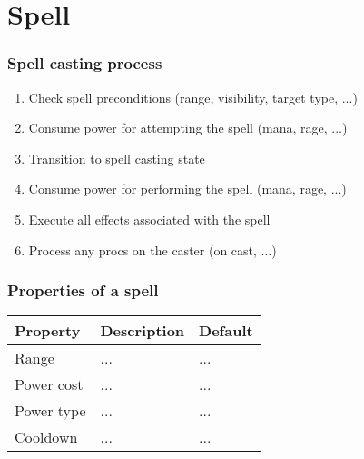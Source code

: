 \chapter{Spell}

\subsection*{Spell casting process}

\begin{enumerate}
	\item  Check spell preconditions (range, visibility, target type, ...)
	\item  Consume power for attempting the spell (mana, rage, ...)
	\item  Transition to spell casting state
	\item  Consume power for performing the spell (mana, rage, ...)
	\item  Execute all effects associated with the spell
	\item  Process any procs on the caster (on cast, ...)
\end{enumerate}

\subsection*{Properties of a spell}

\begin{tabular}{p{4cm} l l}
\toprule
Property & Description & Default \\
\midrule
Range & ... & ... \\
Power cost & ... & ... \\
Power type & ... & ... \\
Cooldown & ... & ... \\
\bottomrule
\end{tabular}